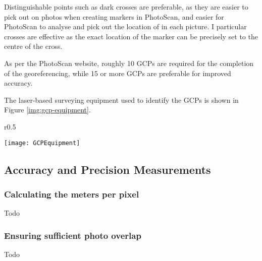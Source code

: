 Distinguishable points such as dark crosses are preferable, as they are easier
to pick out on photos when creating markers in PhotoScan, and easier for
PhotoScan to analyse and pick out the location of in each picture. I particular
crosses are effective as the exact location of the marker can be precisely set
to the centre of the cross.

As per the PhotoScan
website,
roughly 10 GCPs are required for the completion of the georeferencing, while 15
or more GCPs are preferable for improved accuracy.

The laser-based surveying equipment used to identify the GCPs is shown in Figure
\ref{img:gcp-equipment}.

\begin{wrapfigure}{r}{0.5\textwidth}
    \begin{center}
        \texttt{[image: GCPEquipment]}
        \caption{The equipment used to survey in Ground Control Points.}
        \label{img:gcp-equipment}
    \end{center}
\end{wrapfigure}

\subsection{Accuracy and Precision Measurements}

\subsubsection{Calculating the meters per pixel}

Todo

\subsubsection{Ensuring sufficient photo overlap}

Todo
